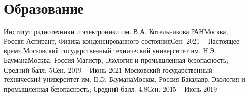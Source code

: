 

\section{Образование}\label{sec:education}
\resumeSubHeadingListStart
\resumeSubheading
{Институт радиотехники и электроники им. В.А. Котельникова РАН}{Москва, Россия}
{Аспирант, Физика конденсированного состояния}{Сен. 2021 -- Настоящее время}
\resumeSubheading
{Московский государственный технический университет им. Н.Э. Баумана}{Москва, Россия}
{Магистр, Экология и промышленная безопасность; Средний балл: 5}{Сен. 2019 -- Июнь 2021}
\resumeSubheading
{Московский государственный технический университет им. Н.Э. Баумана}{Москва, Россия}
{Бакалавр, Экология и промышленная безопасность; Средний балл: 4.8}{Сен. 2015 -- Июнь 2019}
\resumeSubHeadingListEnd